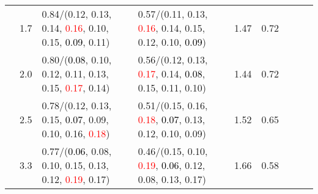 \documentclass[10pt,a4paper]{report}
\begin{document}
\begin{table}[!htbp]
\begin{center}
{\begin{tabular}{ccllccccc}
				  & 1.7                               & 0.84/(0.12, 0.13, 0.14, \textcolor{red}{0.16}, 0.10, 0.15, \textcolor{black}{0.09}, 0.11)                                                                                                     & 0.57/(0.11, 0.13, \textcolor{red}{0.16}, 0.14, 0.15, 0.12, 0.10, \textcolor{black}{0.09})                                                                                                     & 1.47             & 0.72                     \\
				  & 2.0                               & 0.80/(\textcolor{black}{0.08}, 0.10, 0.12, 0.11, 0.13, 0.15, \textcolor{red}{0.17}, 0.14)                                                                                                     & 0.56/(0.12, 0.13, \textcolor{red}{0.17}, 0.14, \textcolor{black}{0.08}, 0.15, 0.11, 0.10)                                                                                                     & 1.44             & 0.72                     \\
				  & 2.5                               & 0.78/(0.12, 0.13, 0.15, \textcolor{black}{0.07}, 0.09, 0.10, 0.16, \textcolor{red}{0.18})                                                                                                     & 0.51/(0.15, 0.16, \textcolor{red}{0.18}, \textcolor{black}{0.07}, 0.13, 0.12, 0.10, 0.09)                                                                                                     & 1.52             & 0.65                     \\
				  & 3.3                               & 0.77/(\textcolor{black}{0.06}, 0.08, 0.10, 0.15, 0.13, 0.12, \textcolor{red}{0.19}, 0.17)                                                                                                     & 0.46/(0.15, 0.10, \textcolor{red}{0.19}, \textcolor{black}{0.06}, 0.12, 0.08, 0.13, 0.17)                                                                                                     & 1.66             & 0.58                     \\
				\bottomrule
			\end{tabular}}
	\end{center}
\end{table}
\end{document}
